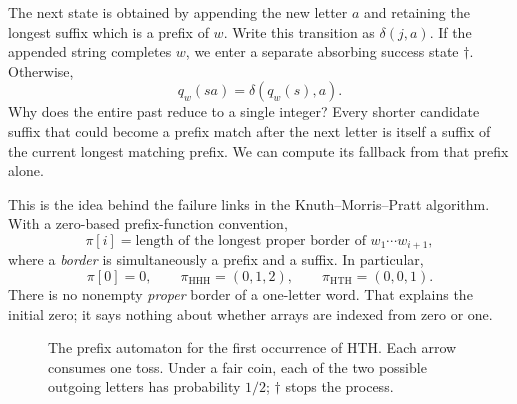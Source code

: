 The next state is obtained by appending the new letter \(a\) and retaining the longest suffix which is a prefix of \(w\). Write this transition as \(\delta(j,a)\). If the appended string completes \(w\), we enter a separate absorbing success state \(\dagger\). Otherwise,
\[
 q_w(sa)=\delta(q_w(s),a).
\]
Why does the entire past reduce to a single integer? Every shorter candidate suffix that could become a prefix match after the next letter is itself a suffix of the current longest matching prefix. We can compute its fallback from that prefix alone.

This is the idea behind the failure links in the Knuth--Morris--Pratt algorithm. With a zero-based prefix-function convention,
\[
 \pi[i]=\text{length of the longest proper border of }
          w_1\cdots w_{i+1},
\]
where a \emph{border} is simultaneously a prefix and a suffix. In particular,
\[
 \pi[0]=0,\qquad
 \pi_{\mathrm{HHH}}=(0,1,2),\qquad
 \pi_{\mathrm{HTH}}=(0,0,1).
\]
There is no nonempty \emph{proper} border of a one-letter word. That explains the initial zero; it says nothing about whether arrays are indexed from zero or one.

\begin{figure}[htbp]
\centering
{}
\caption{The prefix automaton for the first occurrence of \(\mathrm{HTH}\). Each arrow consumes one toss. Under a fair coin, each of the two possible outgoing letters has probability \(1/2\); \(\dagger\) stops the process.}
\label{fig:N20261107-HTH-automaton}
\end{figure}

